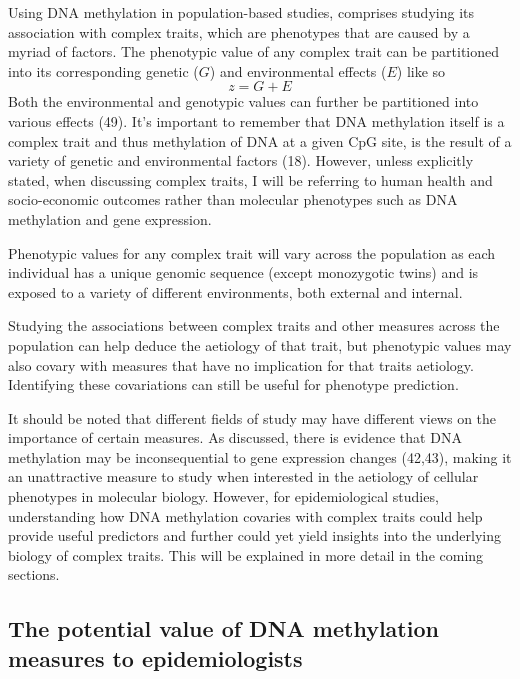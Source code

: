 \documentclass[11pt,oneside]{bristolthesis}
\begin{document}
Using DNA methylation in population-based studies, comprises studying its association with complex traits, which are phenotypes that are caused by a myriad of factors. The phenotypic value of any complex trait can be partitioned into its corresponding genetic (\(G\)) and environmental effects (\(E\)) like so
\begin{equation}
    z = G + E
    \label{eq:phenotypic-values}
\end{equation}
Both the environmental and genotypic values can further be partitioned into various effects (49). It's important to remember that DNA methylation itself is a complex trait and thus methylation of DNA at a given CpG site, is the result of a variety of genetic and environmental factors (18). However, unless explicitly stated, when discussing complex traits, I will be referring to human health and socio-economic outcomes rather than molecular phenotypes such as DNA methylation and gene expression.

Phenotypic values for any complex trait will vary across the population as each individual has a unique genomic sequence (except monozygotic twins) and is exposed to a variety of different environments, both external and internal.

Studying the associations between complex traits and other measures across the population can help deduce the aetiology of that trait, but phenotypic values may also covary with measures that have no implication for that traits aetiology. Identifying these covariations can still be useful for phenotype prediction.

It should be noted that different fields of study may have different views on the importance of certain measures. As discussed, there is evidence that DNA methylation may be inconsequential to gene expression changes (42,43), making it an unattractive measure to study when interested in the aetiology of cellular phenotypes in molecular biology. However, for epidemiological studies, understanding how DNA methylation covaries with complex traits could help provide useful predictors and further could yet yield insights into the underlying biology of complex traits. This will be explained in more detail in the coming sections.

\hypertarget{appeal-of-dnam}{%
\subsection{The potential value of DNA methylation measures to epidemiologists}\label{appeal-of-dnam}}
\end{document}
